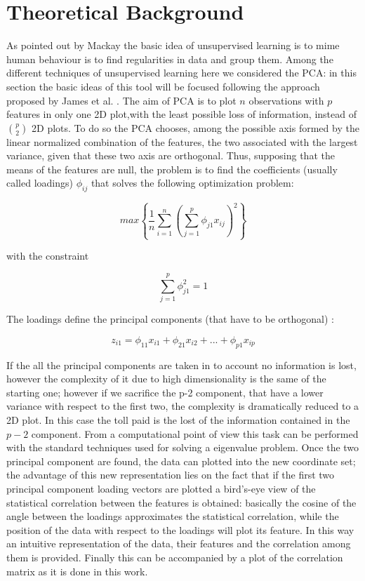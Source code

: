 \documentclass[
12pt, %
a4paper, %
oneside, %
headinclude,footinclude, %
BCOR5mm, %
]{scrartcl}
\begin{document}
\section{Theoretical Background} \label{Theoretical Background}
As pointed out by Mackay \cite{mackay2003information} the basic idea of unsupervised learning is to mime human behaviour is to find regularities in data and group them. Among the different techniques of unsupervised learning \cite{james2013introduction} here we considered the PCA: in this section the basic ideas of this tool will be focused following the approach proposed by James et al. \cite{james2013introduction}. The aim of PCA is to plot $n$ observations with $p$ features in only one 2D plot,with the least possible loss of information, instead of $\binom{p}{2}$ 2D plots. To do so the PCA chooses, among the possible axis formed by the linear normalized combination of the features, the two associated with the largest variance, given that these two axis are orthogonal. Thus, supposing that the means of the features are null, the problem is to find the coefficients (usually called loadings) $\phi_{ij}$ that solves the following optimization problem:

\begin{equation}
max\left\lbrace \dfrac{1}{n} \sum_{i=1}^{n} \left(\sum^{p} _{j=1} \phi_{j1}x_{ij} \right)^{2}   \right\rbrace
\end{equation}

with the constraint 

\begin{equation}
\sum_{j=1}^{p}\phi_{j1}^{2}=1
\end{equation}

The loadings define the principal components (that have to be orthogonal) : 

\begin{equation}
z_{i1}=\phi_{11}x_{i1}+\phi_{21}x_{i2}+...+\phi_{p1}x_{ip}
\end{equation}

If the all the principal components are taken in to account no information is lost, however the complexity of it due to high dimensionality is the same of the starting one; however if we sacrifice the p-2 component, that have a lower variance with respect to the first two, the complexity is dramatically reduced to a 2D plot. In this case the toll paid is the lost of the information contained in the $p-2$ component. From a computational point of view this task can be performed with the standard techniques used for solving a eigenvalue problem. Once the two principal component are found, the data can plotted into the new coordinate set; the advantage of this new representation lies on the fact that if the first two principal component loading vectors are plotted a bird's-eye view of the statistical correlation between the features is obtained: basically the cosine of the angle between the loadings approximates the statistical correlation, while the position of the data with respect to the loadings will plot its feature. In this way an intuitive representation of the data, their features and the correlation among them is provided. Finally this can be accompanied by a plot of the correlation matrix as it is done in this work. 
\end{document}
